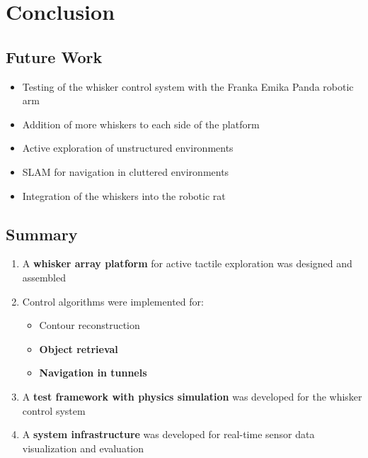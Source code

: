 

\chapter{Conclusion}


\section{Future Work}
\begin{itemize}
    \item Testing of the whisker control system with the Franka Emika Panda robotic arm
    \item Addition of more whiskers to each side of the platform
    \item Active exploration of unstructured environments
    \item SLAM for navigation in cluttered environments
    \item Integration of the whiskers into the robotic rat
\end{itemize}


\section{Summary}

\begin{enumerate}
    \item A \textbf{whisker array platform} for active tactile exploration was designed and assembled
    \item Control algorithms were implemented for:
    \begin{itemize}
        \item Contour reconstruction
        \item \textbf{Object retrieval}
        \item \textbf{Navigation in tunnels}
    \end{itemize}
    \item A \textbf{test framework with physics simulation} was developed for the whisker control system
    \item A \textbf{system infrastructure} was developed for real-time sensor data visualization and evaluation
\end{enumerate}